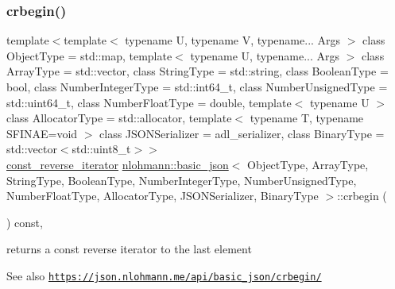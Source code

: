 \subsubsection{\texorpdfstring{crbegin()}{crbegin()}}
{\footnotesize\ttfamily template$<$template$<$ typename U, typename V, typename... Args $>$ class Object\+Type = std\+::map, template$<$ typename U, typename... Args $>$ class Array\+Type = std\+::vector, class String\+Type  = std\+::string, class Boolean\+Type  = bool, class Number\+Integer\+Type  = std\+::int64\+\_\+t, class Number\+Unsigned\+Type  = std\+::uint64\+\_\+t, class Number\+Float\+Type  = double, template$<$ typename U $>$ class Allocator\+Type = std\+::allocator, template$<$ typename T, typename S\+F\+I\+N\+A\+E=void $>$ class J\+S\+O\+N\+Serializer = adl\+\_\+serializer, class Binary\+Type  = std\+::vector$<$std\+::uint8\+\_\+t$>$$>$ \\
\hyperlink{classnlohmann_1_1basic__json_aa7dba16ed9ee97380aeb17a207dd919a}{const\+\_\+reverse\+\_\+iterator} \hyperlink{classnlohmann_1_1basic__json}{nlohmann\+::basic\+\_\+json}$<$ Object\+Type, Array\+Type, String\+Type, Boolean\+Type, Number\+Integer\+Type, Number\+Unsigned\+Type, Number\+Float\+Type, Allocator\+Type, J\+S\+O\+N\+Serializer, Binary\+Type $>$\+::crbegin (\begin{DoxyParamCaption}{ }\end{DoxyParamCaption}) const\hspace{0.3cm}{\ttfamily [inline]}, {\ttfamily [noexcept]}}



returns a const reverse iterator to the last element 

\begin{DoxySeeAlso}{See also}
\href{https://json.nlohmann.me/api/basic_json/crbegin/}{\tt https\+://json.\+nlohmann.\+me/api/basic\+\_\+json/crbegin/} 
\end{DoxySeeAlso}
\mbox{\label{classnlohmann_1_1basic__json_a223480466a0922267d680ec8f0722d58}} 
